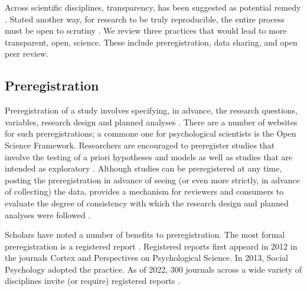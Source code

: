 \documentclass[
  11pt,
]{book}
\begin{document}
Across scientific disciplines, transparency, has been suggested as potential remedy \citep{open_science_collaboration_estimating_2015, van_t_veer_pre-registration_2016}. Stated another way, for research to be truly reproducible, the entire process must be open to scrutiny \citep{stevens_replicability_2017}. We review three practices that would lead to more transparent, open, science. These include preregistration, data sharing, and open peer review.

\hypertarget{preregistration}{%
\subsection{Preregistration}\label{preregistration}}

Preregistration of a study involves specifying, in advance, the research questions, variables, research design and planned analyses \citep{stevens_replicability_2017}. There are a number of websites for such preregistrations; a commone one for psychological scientists is the Open Science Framework. Researchers are encouraged to preregister studies that involve the testing of a priori hypotheses and models as well as studies that are intended as exploratory \citep{bosnjak_template_2021}. Although studies can be preregistered at any time, posting the preregistration in advance of seeing (or even more strictly, in advance of collecting) the data, provides a mechanism for reviewers and consumers to evaluate the degree of consistency with which the research design and planned analyses were followed \citep{bosnjak_template_2021, haven_preregistering_2020}.

Scholars have noted a number of benefits to preregistration. The most formal preregistration is a registered report \citep{osf_open_2022}. Registered reports first appeard in 2012 in the journals Cortex and Perspectives on Psychological Science. In 2013, Social Psychology adopted the practice. As of 2022, 300 journals across a wide variety of disciplines invite (or require) registered reports \citep{chambers_past_2022}.
\end{document}
